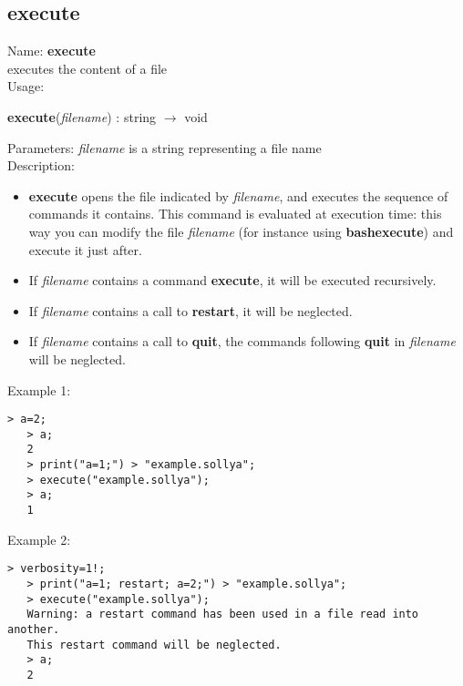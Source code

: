 \subsection{ execute }
\noindent Name: \textbf{execute}\\
executes the content of a file\\

\noindent Usage: 
\begin{center}
\textbf{execute}(\emph{filename}) : \textsf{string} $\rightarrow$ \textsf{void}\\
\end{center}
Parameters: 
\emph{filename} is a string representing a file name\\

\noindent Description: \begin{itemize}

\item \textbf{execute} opens the file indicated by \emph{filename}, and executes the sequence of 
   commands it contains. This command is evaluated at execution time: this way you
   can modify the file \emph{filename} (for instance using \textbf{bashexecute}) and execute it
   just after.

\item If \emph{filename} contains a command \textbf{execute}, it will be executed recursively.

\item If \emph{filename} contains a call to \textbf{restart}, it will be neglected.

\item If \emph{filename} contains a call to \textbf{quit}, the commands following \textbf{quit}
   in \emph{filename} will be neglected.
\end{itemize}
\noindent Example 1: 
\begin{center}\begin{minipage}{14.8cm}\begin{Verbatim}[frame=single]
   > a=2;
   > a;
   2
   > print("a=1;") > "example.sollya";
   > execute("example.sollya"); 
   > a;
   1
\end{Verbatim}
\end{minipage}\end{center}
\noindent Example 2: 
\begin{center}\begin{minipage}{14.8cm}\begin{Verbatim}[frame=single]
   > verbosity=1!;
   > print("a=1; restart; a=2;") > "example.sollya";
   > execute("example.sollya"); 
   Warning: a restart command has been used in a file read into another.
   This restart command will be neglected.
   > a;
   2
\end{Verbatim}
\end{minipage}\end{center}
